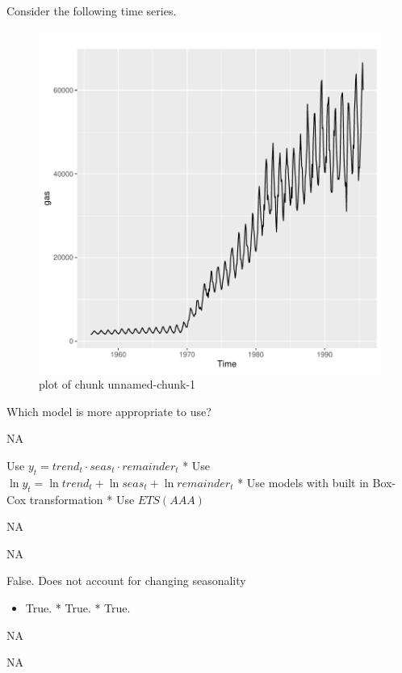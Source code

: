 
\begin{question}
Consider the following time series.

\begin{figure}
\centering
\includegraphics{unnamed-chunk-1-1.pdf}
\caption{plot of chunk unnamed-chunk-1}
\end{figure}

Which model is more appropriate to use?
\begin{answerlist}
  \item NA
  \item Use \(y_t = trend_t \cdot seas_t \cdot remainder_t\) * Use \(\ln y_t = \ln trend_t + \ln seas_t + \ln remainder_t\) * Use models with built in Box-Cox transformation * Use \(ETS(AAA)\)
  \item NA
  \item NA
\end{answerlist}
\end{question}

\begin{solution}
\begin{answerlist}
  \item False. Does not account for changing seasonality
  \item \begin{itemize}
\tightlist
\item
  True. * True. * True.
\end{itemize}
  \item NA
  \item NA
\end{answerlist}
\end{solution}


